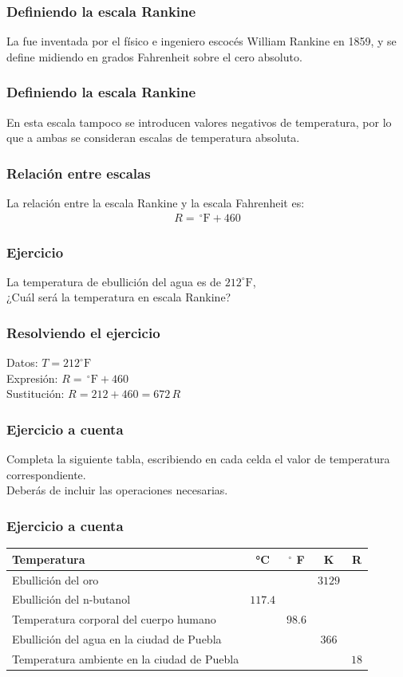 \documentclass[14pt]{beamer}
\begin{document}
\begin{frame}
\frametitle{Definiendo la escala Rankine}
La  fue inventada por el físico e ingeniero escocés William Rankine
en 1859, \pause y se define midiendo en grados Fahrenheit sobre el cero absoluto.
\end{frame}
\begin{frame}
\frametitle{Definiendo la escala Rankine}
En esta escala tampoco se introducen valores negativos de temperatura, por lo que a ambas se consideran escalas de temperatura absoluta.
\end{frame}
\begin{frame}
\frametitle{Relación entre escalas}
La relación entre la escala Rankine y la escala Fahrenheit es:
\pause
\begin{align*}
R = \, ^{\circ}\text{F} + 460
\end{align*}
\end{frame}
\begin{frame}
\frametitle{Ejercicio}
La temperatura de ebullición del agua es de $212 ^{\circ}\text{F}$,
\\
\bigskip
\pause
¿Cuál será la temperatura en escala Rankine?
\end{frame}
\begin{frame}
\frametitle{Resolviendo el ejercicio}
Datos: $T = 212 ^{\circ}\text{F}$  \\[0.5em]\pause
Expresión: $R = \, ^{\circ}\text{F} + 460$ \\[0.5em]\pause
Sustitución: $R = 212 + 460 = 672 \, R$
\end{frame}
\begin{frame}
\frametitle{Ejercicio a cuenta}
Completa la siguiente tabla, escribiendo en cada celda el valor de temperatura correspondiente.
\\
\bigskip
\pause
Deberás de incluir las operaciones necesarias.
\end{frame}
\begin{frame}
\frametitle{Ejercicio a cuenta}
\begin{table}
\fontsize{10}{10}\selectfont
\centering
\begin{tabular}{| l | c | c | c | c |} \hline
Temperatura & \unit{\degreeCelsius} & $^{\circ}$ F & K & R \\ \hline
Ebullición del oro & & & $3129$ & \\ \hline
Ebullición del n-butanol & $117.4$ & & & \\ \hline
Temperatura corporal del cuerpo humano & & $98.6$ & & \\ \hline
Ebullición del agua en la ciudad de Puebla & & & $366$ & \\ \hline
Temperatura ambiente en la ciudad de Puebla & & & & $18$ \\ \hline
\end{tabular}
\end{table}
\end{frame}
\end{document}
